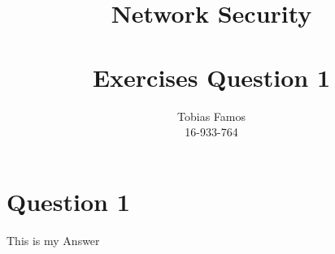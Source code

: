 \documentclass[11pt,a4paper]{article}
\title{Network Security \\ ~\\ \Large{Exercises Question 1}}
\author{Tobias Famos\\ 16-933-764}
\begin{document}
    \maketitle
    \section{Question 1}
    This is my Answer
\end{document}
